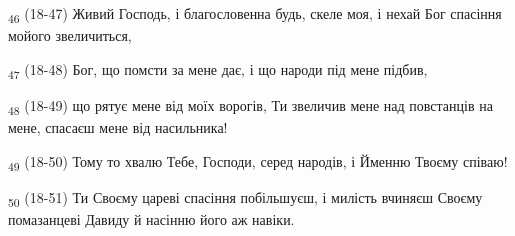 \begin{tcolorbox}
\textsubscript{46} (18-47) Живий Господь, і благословенна будь, скеле моя, і нехай Бог спасіння мойого звеличиться,
\end{tcolorbox}
\begin{tcolorbox}
\textsubscript{47} (18-48) Бог, що помсти за мене дає, і що народи під мене підбив,
\end{tcolorbox}
\begin{tcolorbox}
\textsubscript{48} (18-49) що рятує мене від моїх ворогів, Ти звеличив мене над повстанців на мене, спасаєш мене від насильника!
\end{tcolorbox}
\begin{tcolorbox}
\textsubscript{49} (18-50) Тому то хвалю Тебе, Господи, серед народів, і Йменню Твоєму співаю!
\end{tcolorbox}
\begin{tcolorbox}
\textsubscript{50} (18-51) Ти Своєму цареві спасіння побільшуєш, і милість вчиняєш Своєму помазанцеві Давиду й насінню його аж навіки.
\end{tcolorbox}
